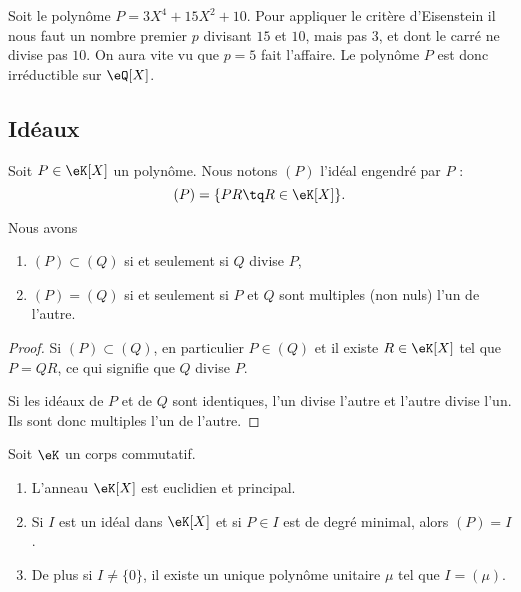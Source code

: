 \begin{example}
	Soit le polynôme \( P=3X^4+15 X^2+10\). Pour appliquer le critère d'Eisenstein il nous faut un nombre premier \( p\) divisant \( 15\) et \( 10\), mais pas \( 3\), et dont le carré ne divise pas \( 10\). On aura vite vu que \( p=5\) fait l'affaire. Le polynôme \( P\) est donc irréductible sur \( \eQ[X]\).
\end{example}

\subsection{Idéaux}

Soit \( P\in \eK[X]\) un polynôme. Nous notons \( (P)\) l'idéal engendré par \( P\) :
\begin{equation}        \label{EqDefxMkDtW}
	(P)=\{ PR\tq R\in\eK[X] \}.
\end{equation}

\begin{lemma}
	Nous avons
	\begin{enumerate}
		\item
		      \( (P)\subset (Q)\) si et seulement si \( Q\) divise \( P\),
		\item
		      \( (P)=(Q)\) si et seulement si \( P\) et \( Q\) sont multiples (non nuls) l'un de l'autre.
	\end{enumerate}
\end{lemma}

\begin{proof}
	Si \( (P)\subset (Q)\), en particulier \( P\in(Q)\) et il existe \( R\in\eK[X]\) tel que \( P=QR\), ce qui signifie que \( Q\) divise \( P\).

	Si les idéaux de \( P\) et de \( Q\) sont identiques, l'un divise l'autre et l'autre divise l'un. Ils sont donc multiples l'un de l'autre.
\end{proof}

\begin{theorem}     \label{ThoCCHkoU}
	Soit \( \eK\) un corps commutatif.
	\begin{enumerate}
		\item       \label{ITEMooLZWMooDRsRwW}
		      L'anneau \( \eK[X]\) est euclidien et principal.
		\item
		      Si \( I\) est un idéal dans \( \eK[X]\) et si \( P \in I\) est de degré minimal, alors \( (P)=I\).
		\item   \label{ITEMooASHKooZqkiCH}
		      De plus si \( I\neq \{  0\}\), il existe un unique polynôme unitaire \( \mu\) tel que \( I=(\mu)\).
	\end{enumerate}
\end{theorem}

